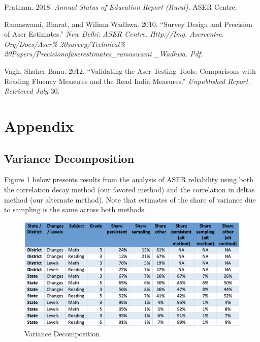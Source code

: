 \documentclass[
  11pt,
]{article}
\begin{document}
\leavevmode\hypertarget{ref-aser2018}{}%
Pratham. 2018. \emph{Annual Status of Education Report (Rural)}. ASER Centre.

\leavevmode\hypertarget{ref-ramaswami2010survey}{}%
Ramaswami, Bharat, and Wilima Wadhwa. 2010. ``Survey Design and Precision of Aser Estimates.'' \emph{New Delhi: ASER Centre. Http://Img. Asercentre. Org/Docs/Aser\% 20survey/Technical\% 20Papers/Precisionofaserestimates\_ramaswami \_Wadhwa. Pdf}.

\leavevmode\hypertarget{ref-vagh2012validating}{}%
Vagh, Shaher Banu. 2012. ``Validating the Aser Testing Tools: Comparisons with Reading Fluency Measures and the Read India Measures.'' \emph{Unpublished Report. Retrieved July} 30.

\newpage

\hypertarget{appendix}{%
\section{Appendix}\label{appendix}}

\hypertarget{variance-decomposition}{%
\subsection{Variance Decomposition}\label{variance-decomposition}}

Figure \ref{fig:variance} below presents results from the analysis of ASER reliability using both the correlation decay method (our favored method) and the correlation in deltas method (our alternate method). Note that estimates of the share of variance due to sampling is the same across both methods.

\begin{figure}

{\centering \includegraphics[width=0.8\linewidth]{variance_decomp} 

}

\caption{Variance Decomposition}\label{fig:variance}
\end{figure}
\end{document}
